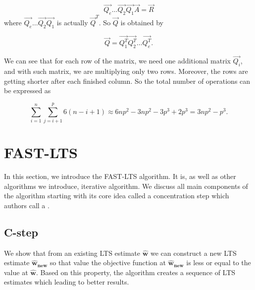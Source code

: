 \begin{equation}
    \vec{Q_e}\ldots\vec{Q_2}\vec{Q_1}\vec{A} = \vec{R}
\end{equation}
where $\vec{Q_e}\ldots\vec{Q_2}\vec{Q_1}$ is actually $\vec{Q}^T$. So $\vec{Q}$ is obtained by 

\begin{equation}
 \vec{Q} = \vec{Q_1^T}\vec{Q_2^T}\ldots\vec{Q_e^T}.
\end{equation}

We can see that for each row of the matrix, we need one additional matrix $\vec{Q_i}$, and with such matrix, we are multiplying only two rows. Moreover, the rows are getting shorter after each finished column. So the total number of operations can be expressed as

\begin{equation}
    \sum\limits_{i=1}^n  \sum\limits_{j=i+1}^p 6(n-i+1) \approx 6np^2 - 3np^2 - 3p^3 + 2p^3 = 3np^2 - p^3.
\end{equation}





















\section{FAST-LTS} \label{section_fast_lts}
In this section, we introduce the FAST-LTS algorithm\cite{rouss:2000}. 
It is, as well as other algorithms we introduce, iterative algorithm. We discuss all main components of the algorithm starting with its core idea called a concentration step which authors call a .

\subsection{C-step}
We show that from an existing LTS estimate $\boldsymbol{\hat{w}}$ we can construct a new LTS estimate $\boldsymbol{\hat{w}_{new}}$ so that value the objective function at $\boldsymbol{\hat{w}_{new}}$ is less or equal to the value at $\boldsymbol{\hat{w}}$. Based on this property, the algorithm creates a sequence of LTS estimates which leading to better results.


